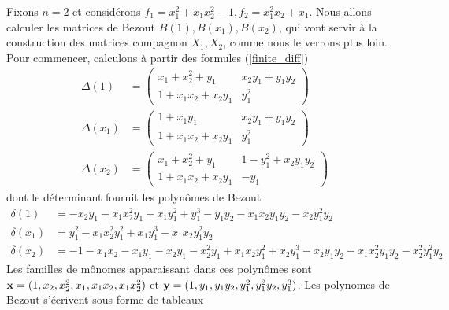 \documentclass{standalone}
\begin{document}
  \begin{exmp}
  \label{ex_bez_multi}
  Fixons $n = 2$ et considérons $f_1 = x_1^2 + x_1x_2^2 - 1, f_2 = x_1^2x_2 + x_1$.
  Nous allons calculer les matrices de Bezout $B(1), B(x_1), B(x_2)$,  qui vont servir à la construction des matrices compagnon $X_1, X_2$, comme nous le verrons plus loin. Pour commencer, calculons à partir des formules (\ref{finite_diff})
  \begin{align}
  \Delta(1) &=
  \begin{pmatrix}
  x_1 + x_2^2 + y_1 & x_2y_1 + y_1y_2 \\
  1 + x_1x_2 + x_2y_1 & y_1^2
  \end{pmatrix} \nonumber  \\
  \Delta(x_1) &=
  \begin{pmatrix}
  1 + x_1y_1 & x_2y_1 + y_1y_2 \\
  1 + x_1x_2 + x_2y_1 & y_1^2
  \end{pmatrix} \nonumber  \\
  \Delta(x_2) &=
  \begin{pmatrix}
  x_1 + x_2^2 + y_1 & 1 - y_1^2 + x_2y_1y_2 \\
  1 + x_1x_2 + x_2y_1  & -y_1
  \end{pmatrix} \nonumber
  \end{align}
  dont le déterminant fournit les polynômes de Bezout
  \begin{align}
  \delta(1) &= -x_2y_1 - x_1x_2^2y_1 + x_1y_1^2 + y_1^3 - y_1y_2 - x_1x_2y_1y_2 - x_2y_1^2y_2 \nonumber \\
  \delta(x_1) &=  y_1^2 - x_1x_2^2y_1^2 + x_1y_1^3 - x_1x_2y_1^2y_2 \nonumber \\
  \delta(x_2) &= -1 - x_1x_2 - x_1y_1 -x_2y_1 - x_2^2y_1 + x_1x_2y_1^2 + x_2y_1^3 - x_2y_1y_2 - x_1x_2^2y_1y_2 - x_2^2y_1^2y_2\nonumber
  \end{align}
  Les familles de mônomes apparaissant dans ces polynômes sont
  $\bold{x} = (1, x_2, x_2^2, x_1, x_1x_2, x_1x_2^2)$ et $\bold{y} = (1, y_1, y_1y_2, y_1^2, y_1^2y_2, y_1^3)$.
  Les polynomes de Bezout s'écrivent sous forme de tableaux\\


\end{exmp}
\end{document}
